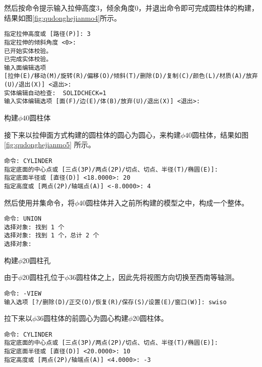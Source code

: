 \begin{procedure}
然后按命令提示输入拉伸高度3，倾余角度0，并退出命令即可完成圆柱体的构建，结果如图\ref{fig:qudonghejianmo4}所示。

\begin{lstlisting}
指定拉伸高度或 [路径(P)]: 3
指定拉伸的倾斜角度 <0>:
已开始实体校验。
已完成实体校验。
输入面编辑选项
[拉伸(E)/移动(M)/旋转(R)/偏移(O)/倾斜(T)/删除(D)/复制(C)/颜色(L)/材质(A)/放弃(U)/退出(X)] <退出>:
实体编辑自动检查:  SOLIDCHECK=1
输入实体编辑选项 [面(F)/边(E)/体(B)/放弃(U)/退出(X)] <退出>:
\end{lstlisting}

\item 构建$\phi 40$圆柱体

接下来以拉伸面方式构建的圆柱体的圆心为圆心，来构建$\phi 40$圆柱体，结果如图\ref{fig:qudonghejianmo5} 所示。
\begin{lstlisting}
命令: CYLINDER
指定底面的中心点或 [三点(3P)/两点(2P)/切点、切点、半径(T)/椭圆(E)]:
指定底面半径或 [直径(D)] <18.0000>: 20
指定高度或 [两点(2P)/轴端点(A)] <-8.0000>: 4
\end{lstlisting}

\begin{figure}[htbp]
\centering
\begin{floatrow}[2]
\end{floatrow}
\end{figure}

然后使用并集命令，将$\phi 40$圆柱体并入之前所构建的模型之中，构成一个整体。

\begin{lstlisting}
命令: UNION
选择对象: 找到 1 个
选择对象: 找到 1 个，总计 2 个
选择对象:
\end{lstlisting}

\item 构建$\phi 20$圆柱孔

由于$\phi 20$圆柱孔位于$\phi 36$圆柱体之上，因此先将视图方向切换至西南等轴测。

\begin{lstlisting}
命令: -VIEW
输入选项 [?/删除(D)/正交(O)/恢复(R)/保存(S)/设置(E)/窗口(W)]: swiso
\end{lstlisting}

拉下来以$\phi 36$圆柱体的前圆心为圆心构建$\phi 20$圆柱体。

\begin{lstlisting}
命令: CYLINDER
指定底面的中心点或 [三点(3P)/两点(2P)/切点、切点、半径(T)/椭圆(E)]:
指定底面半径或 [直径(D)] <20.0000>: 10
指定高度或 [两点(2P)/轴端点(A)] <4.0000>: -3
\end{lstlisting}


\end{procedure}
